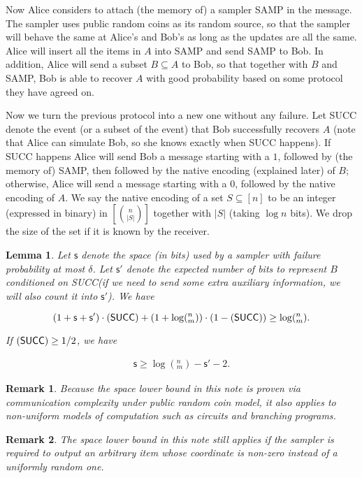 \documentclass[10pt]{article}
\let\Pr\relax
\DeclareMathOperator*{\Pr}{\mathbb{P}}
\newtheorem{lemma}{Lemma}
\newtheorem{remark}{Remark}
\newcommand{\samp}{\textsf{SAMP}\xspace}
\newcommand{\success}{\textsf{SUCC}\xspace}
\newcommand{\s}{\textsf{s}\xspace}
\begin{document}
Now Alice considers to attach (the memory of) a sampler \samp in the message. The sampler uses public random coins as its random source, so that the sampler will behave the same at Alice's and Bob's as long as the updates are all the same. Alice will insert all the items in $A$ into \samp and send \samp to Bob. In addition, Alice will send a subset $B\subseteq A$ to Bob, so that together with $B$ and \samp, Bob is able to recover $A$ with good probability based on some protocol they have agreed on. 
 
Now we turn the previous protocol into a new one without any failure. Let \success denote the event (or a subset of the event) that Bob successfully recovers $A$ (note that Alice can simulate Bob, so she knows exactly when \success happens). If \success happens Alice will send Bob a message starting with a $1$, followed by (the memory of) \samp, then followed by the native encoding (explained later) of $B$; otherwise, Alice will send a message starting with a $0$, followed by the native encoding of $A$. We say the native encoding of a set $S\subseteq [n]$ to be an integer (expressed in binary) in $[{n \choose |S|}]$ together with $|S|$ (taking $\log n$ bits). We drop the size of the set if it is known by the receiver.

\begin{lemma} \label{lemma:lb-meta}
  Let $\s$ denote the space (in bits) used by a sampler with failure probability at most $\delta$. Let $\s'$ denote the expected number of bits to represent $B$ conditioned on \success (if we need to send some extra auxiliary information, we will also count it into $\s'$). We have 
  
  $$(1+\s+\s')\cdot \Pr(\success)+(1+\log (^n_m)) \cdot (1-\Pr(\success)) \ge \log (^n_m).$$
  
  If $\Pr(\success)\ge 1/2$, we have 
  
  \begin{align} \label{formula:lb-meta}
  \s\ge \log (^n_m) - \s' - 2.
  \end{align} 
\end{lemma}

\begin{remark}
  Because the space lower bound in this note is proven via communication complexity under public random coin model, it also applies to non-uniform models of computation such as circuits and branching programs.  
\end{remark}


\begin{remark}
  The space lower bound in this note still applies if the sampler is required to output an arbitrary item whose coordinate is non-zero instead of a uniformly random one. 
\end{remark}
\end{document}

